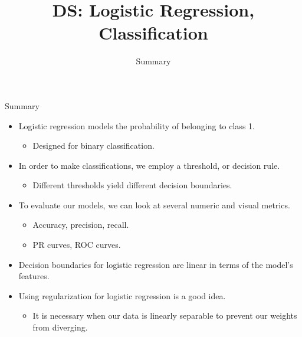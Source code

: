 \documentclass[aspectratio=169]{../latex_main/tntbeamer}  %
\title[Introduction]{DS: Logistic Regression, Classification}
\subtitle{Summary}
\begin{document}
	
	\maketitle
	\begin{frame}{Summary}
	    \begin{itemize}
	        \item Logistic regression models the probability of belonging to class 1.
	        \begin{itemize}
	            \item Designed for binary classification.
	        \end{itemize}
	        \item In order to make classifications, we employ a threshold, or decision rule.
	        \begin{itemize}
	            \item Different thresholds yield different decision boundaries.
	        \end{itemize}
	        \item To evaluate our models, we can look at several numeric and visual metrics.
	        \begin{itemize}
	            \item Accuracy, precision, recall.
	            \item PR curves, ROC curves.
	        \end{itemize}
	        \item Decision boundaries for logistic regression are linear in terms of the model’s features.
	        \item Using regularization for logistic regression is a good idea.
	        \begin{itemize}
	            \item It is necessary when our data is linearly separable to prevent our weights from diverging.
	        \end{itemize}
	    \end{itemize}
	\end{frame}
	
	
\end{document}
